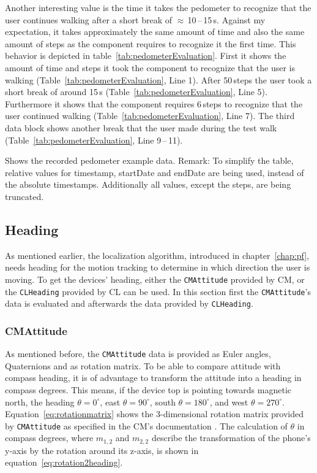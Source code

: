 Another interesting value is the time it takes the pedometer to recognize that the user continues walking after a short break of $\approx$\,10\,--\,15\,s. Against my expectation, it takes approximately the same amount of time and also the same amount of steps as the component requires to recognize it the first time. This behavior is depicted in table~\ref{tab:pedometerEvaluation}. First it shows the amount of time and steps it took the component to recognize that the user is walking (Table~\ref{tab:pedometerEvaluation}, Line 1). After 50\,steps the user took a short break of around 15\,s (Table~\ref{tab:pedometerEvaluation}, Line 5). Furthermore it shows that the component requires 6\,steps to recognize that the user continued walking (Table~\ref{tab:pedometerEvaluation}, Line 7). The third data block shows another break that the user made during the test walk (Table~\ref{tab:pedometerEvaluation}, Line 9\,--\,11).

\begin{table}
	
	\caption{Shows the recorded pedometer example data. Remark: To simplify the table, relative values for timestamp, startDate and endDate are being used, instead of the absolute timestamps. Additionally all values, except the steps, are being truncated.}
	\label{tab:pedometerEvaluation}
\end{table}


\subsection{Heading}
As mentioned earlier, the localization algorithm, introduced in chapter~\ref{chap:pf}, needs heading for the motion tracking to determine in which direction the user is moving. To get the devices' heading, either the \texttt{CMAttitude} provided by \ac{CM}, or the \texttt{CLHeading} provided by \ac{CL} can be used. In this section first the \texttt{CMAttitude}'s data is evaluated and afterwards the data provided by \texttt{CLHeading}.

\subsubsection*{CMAttitude}
As mentioned before, the \texttt{CMAttitude} data is provided as Euler angles, Quaternions and as rotation matrix. To be able to compare attitude with compass heading, it is of advantage to transform the attitude into a heading in compass degrees. This means, if the device top is pointing towards magnetic north, the heading $\theta = 0^{\circ}$, east $\theta = 90^{\circ}$, south $\theta = 180^{\circ}$, and west $\theta = 270^{\circ}$. Equation~\ref{eq:rotationmatrix} shows the 3-dimensional rotation matrix provided by \texttt{CMAttitude} as specified in the \ac{CM}'s documentation \citep{apple:ios_doc_cm}. The calculation of $\theta$ in compass degrees, where $m_{1,2}$ and $m_{2,2}$ describe the transformation of the phone's y-axis by the rotation around its z-axis, is shown in equation~\ref{eq:rotation2heading}.

